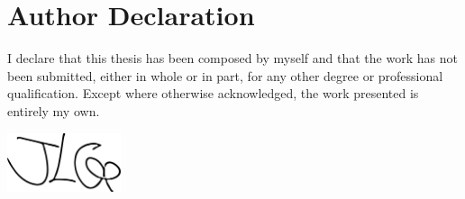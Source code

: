 \chapter*{Author Declaration}
\label{declaration}

{\setlength{\parindent}{0pt}

I declare that this thesis has been composed by myself and that the work has not been submitted, either in whole or in part, for any other degree or professional qualification. Except where otherwise acknowledged, the work presented is entirely my own.

\vspace{3cm}

\includegraphics[width=0.25\textwidth]{img/short_sig}

\thesisauthor{}

\thesisdate{}
}

